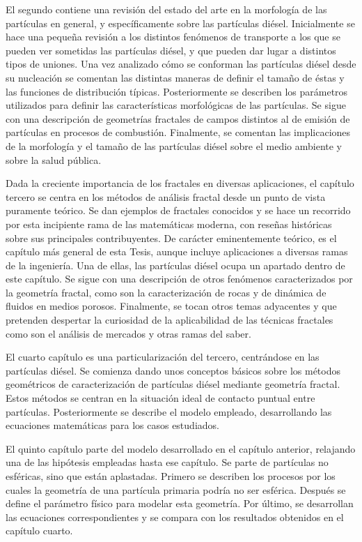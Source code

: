 \par El segundo contiene una revisión del estado del arte en la morfología de las partículas en general, y específicamente sobre las partículas diésel. Inicialmente se hace una pequeña revisión a los distintos fenómenos de transporte a los que se pueden ver sometidas las partículas diésel, y que pueden dar lugar a distintos tipos de uniones. Una vez analizado cómo se conforman las partículas diésel desde su nucleación se comentan las distintas maneras de definir el tamaño de éstas y las funciones de distribución típicas. Posteriormente se describen los parámetros utilizados para definir las características morfológicas de las partículas. Se sigue con una descripción de geometrías fractales de campos distintos al de emisión de partículas en procesos de combustión. Finalmente, se comentan las implicaciones de la morfología y el tamaño de las partículas diésel sobre el medio ambiente y sobre la salud pública.

\par Dada la creciente importancia de los fractales en diversas aplicaciones, el capítulo tercero se centra en los métodos de análisis fractal desde un punto de vista puramente teórico. Se dan ejemplos de fractales conocidos y se hace un recorrido por esta incipiente rama de las matemáticas moderna, con reseñas históricas sobre sus principales contribuyentes. De carácter eminentemente teórico, es el capítulo más general de esta Tesis, aunque incluye aplicaciones a diversas ramas de la ingeniería. Una de ellas, las partículas diésel ocupa un apartado dentro de este capítulo. Se sigue con una descripción de otros fenómenos caracterizados por la geometría fractal, como son la caracterización de rocas y de dinámica de fluidos en medios porosos. Finalmente, se tocan otros temas adyacentes y que pretenden despertar la curiosidad de la aplicabilidad de las técnicas fractales como son el análisis de mercados y otras ramas del saber.

\par El cuarto capítulo es una particularización del tercero, centrándose en las partículas diésel. Se comienza dando unos conceptos básicos sobre los métodos geométricos de caracterización de partículas diésel mediante geometría fractal. Estos métodos se centran en la situación ideal de contacto puntual entre partículas. Posteriormente se describe el modelo empleado, desarrollando las ecuaciones matemáticas para los casos estudiados.

\par El quinto capítulo parte del modelo desarrollado en el capítulo anterior, relajando una de las hipótesis empleadas hasta ese capítulo. Se parte de partículas no esféricas, sino que están aplastadas. Primero se describen los procesos por los cuales la geometría de una partícula primaria podría no ser esférica. Después se define el parámetro físico para modelar esta geometría. Por último, se desarrollan las ecuaciones correspondientes y se compara con los resultados obtenidos en el capítulo cuarto.

